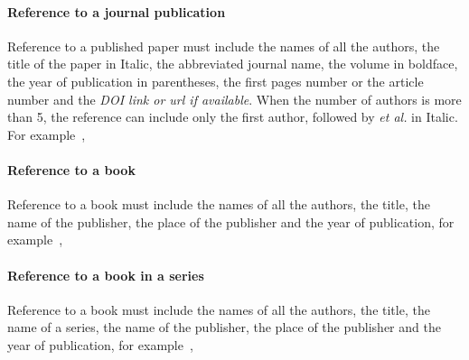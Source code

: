 \documentclass[a4,11pt]{cip-v3-cls-submit}
\begin{document}
\paragraph*{Reference to a journal publication}
Reference to a published paper must include the names of all the authors, the title of the paper in Italic, the abbreviated journal name, the volume in boldface, the year of publication in parentheses, the first pages number or the article number and the \textit{DOI link or url if available}. When the number of authors is more than 5, the reference can include only the first author, followed by {\it et al.} in Italic.
For example~\cite{streda1989quantised, molenkamp1990quantum, abudinen2021precise},

\paragraph*{Reference to a book}
Reference to a book must include the names of all the authors, the title, the name of the publisher, the place of the publisher and the year of publication, for example~\cite{grabert2013single},

\paragraph*{Reference to a book in a series}

Reference to a book must include the names of all the authors, the title, the name of a series, the name of the publisher, the place of the publisher and the year of publication, for example~\cite{Santal'o1976},
\end{document}
